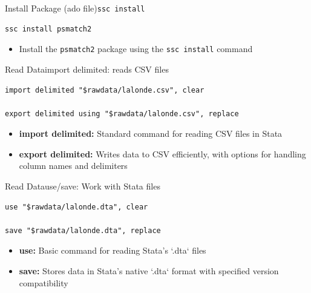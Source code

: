 \documentclass[dvipsnames,hyperref={pdfpagelabels=false}]{beamer}
\begin{document}
\begin{frame}[fragile]{Install Package (ado file)}{\texttt{ssc install}}
\begin{lstlisting}
ssc install psmatch2
\end{lstlisting}
	\begin{itemize}
		\vspace{0.2cm}
        \item Install the \texttt{psmatch2} package using the \texttt{ssc install} command
	\end{itemize}
\end{frame}


\begin{frame}[fragile]{Read Data}{import delimited: reads CSV files}
\begin{lstlisting}
import delimited "$rawdata/lalonde.csv", clear

export delimited using "$rawdata/lalonde.csv", replace
\end{lstlisting}
	
	\begin{itemize}
		\vspace{0.2cm}
		\item \textbf{import delimited:} Standard command for reading CSV files in Stata
		\vspace{0.2cm}
		\item \textbf{export delimited:} Writes data to CSV efficiently, with options for handling column names and delimiters
	\end{itemize}
\end{frame}

\begin{frame}[fragile]{Read Data}{use/save: Work with Stata files}
\begin{lstlisting}
use "$rawdata/lalonde.dta", clear

save "$rawdata/lalonde.dta", replace
\end{lstlisting}
	
	\begin{itemize}
		\vspace{0.2cm}
		\item \textbf{use:} Basic command for reading Stata's `.dta` files
		\vspace{0.2cm}
		\item \textbf{save:} Stores data in Stata's native `.dta` format with specified version compatibility
		\vspace{0.2cm}
	\end{itemize}
\end{frame}
\end{document}
